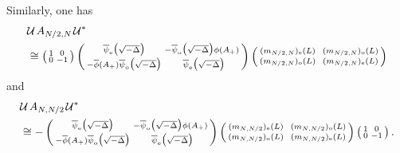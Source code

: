 \documentclass[11pt]{article}
\def\U{\mathcal U}
\begin{document}
Similarly, one has
\begin{align}\label{eq_D2b}
\nonumber & \U \;\! A_{N/2,N}\;\! \U^*\\
& \cong \left(\begin{smallmatrix}1 & 0 \\ 0 & -1\end{smallmatrix}\right)
\left(\begin{smallmatrix}
\overline{\psi}_{\rm e}\big(\sqrt{-\Delta}\big) &  - \overline{\psi}_{\rm o}\big(\sqrt{-\Delta}\big)
\phi(A_+)\\
-\overline{\phi}(A_+) \overline{\psi}_{\rm o}\big(\sqrt{-\Delta}\big) 
&\  \overline{\psi}_{\rm e}\big(\sqrt{-\Delta}\big)
\end{smallmatrix}\right)
\left(\begin{smallmatrix}
(m_{N/2,N})_{\rm e}(L)~ &  (m_{N/2,N})_{\rm o}(L)\\
(m_{N/2,N})_{\rm o}(L)~ &  (m_{N/2,N})_{\rm e}(L)
\end{smallmatrix}\right)
\end{align}
and
\begin{align}\label{eq_D3b}
\nonumber & \U \;\! A_{N,N/2}\;\! \U^*\\
& \cong -\left(\begin{smallmatrix}
\overline{\psi}_{\rm e}\big(\sqrt{-\Delta}\big) &  - \overline{\psi}_{\rm o}\big(\sqrt{-\Delta}\big)
\phi(A_+)\\
-\overline{\phi}(A_+) \overline{\psi}_{\rm o}\big(\sqrt{-\Delta}\big) 
&\  \overline{\psi}_{\rm e}\big(\sqrt{-\Delta}\big)
\end{smallmatrix}\right)
\left(\begin{smallmatrix}
(m_{N,N/2})_{\rm e}(L)~ &  (m_{N,N/2})_{\rm o}(L)\\
(m_{N,N/2})_{\rm o}(L)~ &  (m_{N,N/2})_{\rm e}(L)
\end{smallmatrix}\right)
 \left(\begin{smallmatrix}1 & 0 \\ 0 & -1\end{smallmatrix}\right).
\end{align}
\end{document}
